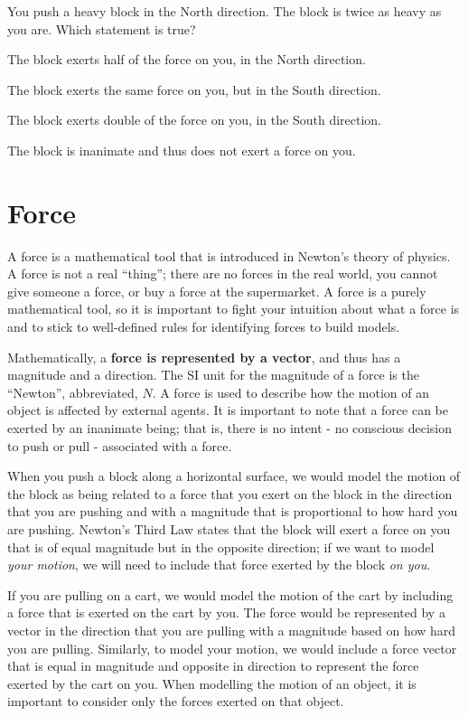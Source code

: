\begin{checkpoint}
\begin{MCquestion}{You push a heavy block in the North direction. The block is twice as heavy as you are. Which statement is true?}
\item The block exerts half of the force on you, in the North direction.
\item The block exerts the same force on you, but in the South direction. \correct
\item The block exerts double of the force on you, in the South direction.
\item The block is inanimate and thus does not exert a force on you. 
\end{MCquestion}
\end{checkpoint}

\section{Force}
A force is a mathematical tool that is introduced in Newton's theory of physics. A force is not a real ``thing''; there are no forces in the real world, you cannot give someone a force, or buy a force at the supermarket. A force is a purely mathematical tool, so it is important to fight your intuition about what a force is and to stick to well-defined rules for identifying forces to build models.

Mathematically, a \textbf{force is represented by a vector}, and thus has a magnitude and a direction. The SI unit for the magnitude of a force is the ``Newton'', abbreviated, $\si{N}$. A force is used to describe how the motion of an object is affected by external agents. It is important to note that a force can be exerted by an inanimate being; that is, there is no intent - no conscious decision to push or pull - associated with a force.

When you push a block along a horizontal surface, we would model the motion of the block as being related to a force that you exert on the block in the direction that you are pushing and with a magnitude that is proportional to how hard you are pushing. Newton's Third Law states that the block will exert a force on you that is of equal magnitude but in the opposite direction; if we want to model \textit{your motion}, we will need to include that force exerted by the block \textit{on you}. 

If you are pulling on a cart, we would model the motion of the cart by including a force that is exerted on the cart by you. The force would be represented by a vector in the direction that you are pulling with a magnitude based on how hard you are pulling. Similarly, to model your motion, we would include a force vector that is equal in magnitude and opposite in direction to represent the force exerted by the cart on you. When modelling the motion of an object, it is important to consider only the forces exerted on that object.


